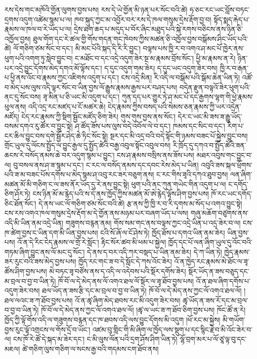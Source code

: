 \documentclass{article}
\begin{document}
རས་དེས་གང་མཁོའི་གྱོན་ལུགས་བྱས་པས། རས་དེ་ཡེ་གྱོན་མི་ཉན་པར་སོང་བའི་ཚེ། ཧ་ཅང་རང་ཡང་བློས་བཏང་དྲགས་འདུག་འཚེམ་སྙམ་པ་ལ། ཁབ་སྐུད་ཀྱང་མ་འབྱོར་བར་རས་དེ་ཁལ་གསུམ་དྲེས་རྡོག་བྱ་བ། སྟོད་སྨད་རྐེད་པ་རྣམས་ལ་ཁལ་བ་རེ་ཡོད་པ་ལ། དྲེས་ཐག་ཆད་པ་མདུད་པ་བོར་ཞིང་མཐུད་པའི་སྐེ་རགས་བཅིངས་ནས་ཉིན་ཅི་འཁྱོལ་བྱས། ཐུལ་གོག་དང་རེ་ཚལ་གྱི་གོས་གདན་གང་ཁེབས་ཀྱིས་མཚན་ཅི་འཁྱོལ་བྱས་བསྒོམས་ཤིང་ཡོད་པའི་ཚེ། ལོ་གཅིག་ཙམ་སོང་བ་དང་། མི་མང་པོའི་སྐད་དི་རི་རི་བྱུང་། བལྟས་པས་ཁྱི་ར་བ་འགའ་ཤ་མང་པོ་ཁྱེར་ནས་ཕུག་པའི་འགག་ཏུ་སླེབ་བྱུང་བ། ང་མཐོང་བ་དང་འདྲེ་འདུག་ཟེར་སྔ་མ་རྣམས་བྲོས་སོང་། ཕྱི་མ་རྣམས་ན་རེ། ཉིན་པར་འདྲེ་བྱུང་དོགས་མེད་དགའ་མོ་ལྟོས་དང་། ད་དུང་འདུག་གམ་ཟེར། ད་དུང་ཡང་འདུག་ཟེར་བས། ཁྱི་ར་བ་རྒན་པ་ཕྱི་ནས་འོང་བ་རྣམས་ཀྱང་འཇིགས་འདུག་པ་དང་། ངས་འདྲེ་མིན། རི་འདི་ལ་བསྒོམ་པའི་སྒོམ་ཆེན་ཡིན་ཏེ། འཚོ་བ་མེད་པས་ལུས་འདི་ལྟར་སོང་བ་ཡིན་བྱས་ལོ་རྒྱུས་རྣམས་རྒྱས་པར་བཤད་པས། བདེན་རྫུན་བལྟའོ་ཟེར་ཕུག་པའི་ནང་དུ་སོང་བས། ཟྭ་མིན་པ་ཅི་ཡང་མི་འདུག་པ་དང་། ཀུན་དད་པར་གྱུར་ཏེ་ཤ་མང་པོ་དང་རྒྱགས་ལྷག་གི་ཕྱེ་རྣམས་ཕུལ་ནས། འདི་འདྲ་རང་མཛད་པ་ངོ་མཚར་ཆེ། ངེད་རྣམས་ཀྱིས་བསད་པའི་སེམས་ཅན་རྣམས་ཀྱི་ཡར་འདྲེན་མཛོད། ངེད་རང་རྣམས་ཀྱི་སྡིག་སྦྱོང་མཛོད་ཅིག་ཟེར། གུས་གུས་བྱས་ནས་སོང་། དེར་ང་ཡང་མི་ཟས་ཟ་རྒྱུ་ཡོད་བསམ་དགའ་རུ་ཚོར་བ་བྱུང་སྟེ། ཤ་ཚོད་ཟོས་པས་ལུས་བདེ་འབོལ་ལེ་བ་དང་། ཁམས་དང་སིང་བ་དང་། རིག་པ་ངར་ཆིལ་བྱུང་བས་དགེ་སྦྱོར་ཤེད་ཆེ་ཏིང་སོང་སྟེ། སྔར་དང་མི་འདྲ་བའི་བདེ་སྟོང་གི་ཉམས་བཟང་པོ་སྐྱེས་བྱུང་བས། གྲོང་ཡུལ་དུ་ལོངས་སྤྱོད་ལ་བྱུང་རྒྱལ་དུ་སྤྱོད་ཚེའི་བརྒྱ་འབུལ་སྟོང་འབུལ་བས། རི་ཁྲོད་དུ་དཀའ་བ་སྤྱོད་ཚེའི་ཟན་ཆངས་རེ་བསོད་ནམས་ཆེ་བར་འདུག་སྙམ་པ་བྱུང་། ངས་ཤ་རྣམས་བསྲིས་ནས་ཟོས་པས། མཐར་འབུས་གང་བྱུང་བ་ལ། བུ་བསལ་ནས་ཤ་ཟ་སྙམ་པ་དང་། ང་རང་ལ་བསོད་ནམས་དང་དབང་རེས་མེད་པ་ཡིན། འབུའི་ཟས་སྐལ་ཕྲོགས་པའི་ཟ་མ་བཟང་པོས་དགོས་པ་མེད་སྙམ་ཤ་འབུ་རང་ཟར་བཅུག་ནས། ང་རང་གིས་ཟྭའི་དཀའ་ཐུབ་བྱས། ལན་ཞིག་མཚན་མོ་མི་གཅིག་ང་ལ་ཟས་ནོར་ཡོད་དུ་རེ་ནས་བྱུང་སྟེ། ཕུག་པའི་ནང་ཀུན་གཡེང་གིན་འདུག་པ་ལ། ང་དགོད་ཅིག་ཤོར་ཏེ། ངས་ཉིན་མོ་མ་རྙེད་པའི་ས་དེ་ནས་ཁྱོད་ཀྱིས་མཚན་མོ་ཨེ་རྙེད་ལྟོས་ཤིག་བྱས་པས། ཁོ་རང་ཡང་དགོད་ཅིང་ཐོན་སོང་། དེ་ནས་ཡང་ལོ་གཅིག་ཙམ་སོང་བའི་ཚེ། རྩ་ནས་ཀྱི་ཁྱི་ར་བ་རི་དྭགས་མ་སོད་པ་འགའ་བྱུང་སྟེ། ངས་རས་འགའ་ཁལ་གསུམ་དྲེས་རྡོག་མ་དེ་གྱོན་ནས་མཉམ་པར་བཞག་ཡོད་པ་ལས། གཞུ་མཆོག་བཙུགས་ནས་འདི་མི་ཡིན་ནམ་འདྲེ་ཡིན། གཟུགས་བརྙན་ནམ། གོས་སམ་གང་ནས་བལྟས་ཀྱང་འདྲེ་ཡིན་པ་འདྲ་ཟེར་བ་ལ། ངས་ཁ་ཚེག་བྱས་ང་ཡིན་དག་མི་ཡིན་བྱས་པས། ངའི་སོ་ཞོ་ལ་ངོ་ཤེས་ཏེ། ཁྱོད་ཐོས་པ་དགའ་ཡིན་ནམ་ཟེར། ཡིན་བྱས་པས། འོ་ན་དེ་རིང་ངེད་རྣམས་ལ་གྲོ་རེ་སློང་། རྟིང་སོར་ཚབ་མི་ཕམ་པ་སྐྱེལ། ཁྱོད་དང་པོ་ལན་ཞིག་ཡུལ་དུ་འོང་བའི་གཏམ་ཞིག་བྱུང་ནས་ལོ་མང་དུ་སོང་། དེ་ནས་ད་བར་འདི་ཀར་བསྡད་པ་ཡིན་ནམ་ཟེར། དེ་ཀ་ཡིན་ཏེ། ཁྱེད་རྣམས་ཟར་རུང་བའི་ཟས་མེད་བྱས་པས། ཁྱོད་རང་གང་ཟ་བ་དེ་སློང་དེ་ཀས་འོང་ཟེར། འོ་ན་ཁྱེད་རང་རྣམས་མེ་ཐོང་ལ་ཟྭ་ཚོས་ཤིག་བྱས་པས། མེ་བཏང་ཟྭ་བཙོས་ནས་ད་འདི་ལ་འདེབས་པའི་སྡོར་དགོས་ཟེར། སྡོར་ཡོད་ན་ཟས་བཅུད་དང་མ་བྲལ་བ་བྱ་བ་ཡིན་ཏེ། ཁོ་བོ་ལ་དེ་མེད་ནས་ལོ་འགའ་ཐལ་ལོ་སྡོར་ལ་ཟྭ་ཐོབ་བྱས་པས། འོ་ན་ཐལ་ཞིག་དགོས་པ་འདུག་ཟེར་བས། ཐལ་ཡོད་ན་ཟས་རྩི་དང་མ་བྲལ་བ་བྱ་བ་ཡིན་ཏེ། ཁོ་བོ་ལ་དེ་མེད་ནས་ཀྱང་ལོ་འགའ་ཐལ་ལོ། །ཐལ་ལའང་ཟ་ཀ་ཐོབ་བྱས་པས། འོ་ན་ཚྭ་ཞིག་མེད་ཐབས་རང་མི་འདུག་ཟེར་བས། ཚྭ་ཡོད་ན་ཟས་རོ་དང་མ་བྲལ་བ་བྱ་བ་ཡིན་ཏེ། ཁོ་བོ་ལ་དེ་མེད་ནས་ཀྱང་ལོ་འགའ་ཐལ་ལོ། །ཚྭ་ལ་ཡང་ཟ་ཀ་ཐོབ་ཅིག་བྱས་པས། ཁོང་ཚོ་ན་རེ། ཁྱོད་ཀྱི་ལྟོ་གོས་འདི་ལ་གཟུགས་བརྙན་དང་ཁ་ཐབས་འདི་ལས་བྱུང་དོགས་མི་འདུག །ཕོ་རང་མ་སྐྱེས། མི་གཡོག་བྱས་རུང་ལྟོ་འགྲངས་ལ་གོས་དྲོ་བ་ཡོང་། འཛམ་བུ་གླིང་གི་མི་ཞིག་ལ་ཁྱོད་ལས་སྡུག་པ་དང་སྙིང་རྗེ་བ་མི་འོང་ཟེར་བ་ལ། ངས་ཁོ་རེ་ཚོ་དེ་སྐད་མ་ཟེར་དང་། ང་མི་ལུས་ལོན་པའི་དྲག་ཤོས་ཤིག་ཡིན་ཏེ། ལྷོ་བྲག་མར་པ་ལོ་ཙཱ་ལྟ་བུ་དང་མཇལ། ཚེ་གཅིག་ལུས་གཅིག་ལ་སངས་རྒྱ་བའི་གདམས་ངག་ཐོབ་ནས། 
\end{document}
